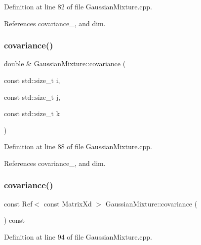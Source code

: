 Definition at line 82 of file Gaussian\+Mixture.\+cpp.



References covariance\+\_\+, and dim.

\mbox{\label{classbfl_1_1GaussianMixture_ad2c74407e682e3b4322df2d0e1cef28e}} 
\subsubsection{\texorpdfstring{covariance()}{covariance()}\hspace{0.1cm}{\footnotesize\ttfamily [3/6]}}
{\footnotesize\ttfamily double \& Gaussian\+Mixture\+::covariance (\begin{DoxyParamCaption}\item[{const std\+::size\+\_\+t}]{i,  }\item[{const std\+::size\+\_\+t}]{j,  }\item[{const std\+::size\+\_\+t}]{k }\end{DoxyParamCaption})}



Definition at line 88 of file Gaussian\+Mixture.\+cpp.



References covariance\+\_\+, and dim.

\mbox{\label{classbfl_1_1GaussianMixture_a172c11264e6ff449a44ec21701eadc4d}} 
\subsubsection{\texorpdfstring{covariance()}{covariance()}\hspace{0.1cm}{\footnotesize\ttfamily [4/6]}}
{\footnotesize\ttfamily const Ref$<$ const Matrix\+Xd $>$ Gaussian\+Mixture\+::covariance (\begin{DoxyParamCaption}{ }\end{DoxyParamCaption}) const}



Definition at line 94 of file Gaussian\+Mixture.\+cpp.



